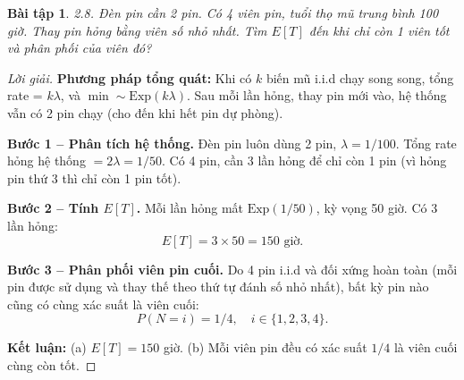 \documentclass[8pt,a4paper]{article}
\newtheorem{exercise}{Bài tập}
\newenvironment{solution}{\begin{proof}[Lời giải]}{\end{proof}}
\begin{document}
\begin{exercise}
2.8. Đèn pin cần 2 pin. Có 4 viên pin, tuổi thọ mũ trung bình 100 giờ. Thay pin hỏng bằng viên số nhỏ nhất. Tìm $E[T]$ đến khi chỉ còn 1 viên tốt và phân phối của viên đó?
\end{exercise}
\begin{solution}
\textbf{Phương pháp tổng quát:} Khi có $k$ biến mũ i.i.d chạy song song, tổng rate = $k\lambda$, và $\min \sim \text{Exp}(k\lambda)$. Sau mỗi lần hỏng, thay pin mới vào, hệ thống vẫn có 2 pin chạy (cho đến khi hết pin dự phòng).

\textbf{Bước 1 -- Phân tích hệ thống.} Đèn pin luôn dùng 2 pin, $\lambda = 1/100$. Tổng rate hỏng hệ thống $= 2\lambda = 1/50$. Có 4 pin, cần 3 lần hỏng để chỉ còn 1 pin (vì hỏng pin thứ 3 thì chỉ còn 1 pin tốt).

\textbf{Bước 2 -- Tính $E[T]$.} Mỗi lần hỏng mất $\text{Exp}(1/50)$, kỳ vọng 50 giờ. Có 3 lần hỏng:
\[
  E[T] = 3 \times 50 = \boxed{150 \text{ giờ}}.
\]

\textbf{Bước 3 -- Phân phối viên pin cuối.} Do 4 pin i.i.d và đối xứng hoàn toàn (mỗi pin được sử dụng và thay thế theo thứ tự đánh số nhỏ nhất), bất kỳ pin nào cũng có cùng xác suất là viên cuối:
\[
  P(N = i) = \boxed{1/4}, \quad i \in \{1, 2, 3, 4\}.
\]

\textbf{Kết luận:} (a) $E[T] = 150$ giờ. (b) Mỗi viên pin đều có xác suất $1/4$ là viên cuối cùng còn tốt.
\end{solution}
\end{document}
